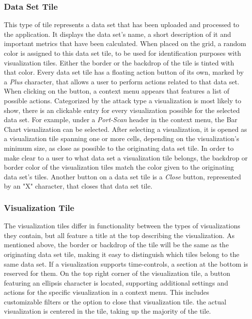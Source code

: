 \subsubsection{Data Set Tile}
This type of tile represents a data set that has been uploaded and processed to the application. It displays the data set's name, a short description of it and important metrics that have been calculated. When placed on the grid, a random color is assigned to this data set tile, to be used for identification purposes with visualization tiles. Either the border or the backdrop of the tile is tinted with that color. Every data set tile has a floating action button of its own, marked by a \emph{Plus} character, that allows a user to perform actions related to that data set. When clicking on the button, a context menu appears that features a list of possible actions. Categorized by the attack type a visualization is most likely to show, there is an clickable entry for every visualization possible for the selected data set. For example, under a \emph{Port-Scan} header in the context menu, the Bar Chart visualization can be selected. After selecting a visualization, it is opened as a visualization tile spanning one or more cells, depending on the visualization’s minimum size, as close as possible to the originating data set tile. In order to make clear to a user to what data set a visualization tile belongs, the backdrop or border color of the visualization tiles match the color given to the originating data set’s tiles. Another button on a data set tile is a \emph{Close} button, represented by an "X" character, that closes that data set tile.
\subsubsection{Visualization Tile}
The visualization tiles differ in functionality between the types of visualizations they contain, but all feature a title at the top describing the visualization. As mentioned above, the border or backdrop of the tile will be the same as the originating data set tile, making it easy to distinguish which tiles belong to the same data set. If a visualization supports time-controls, a section at the bottom is reserved for them. On the top right corner of the visualization tile, a button featuring an ellipsis character is located, supporting additional settings and actions for the specific visualization in a context menu. This includes customizable filters or the option to close that visualization tile. the actual visualization is centered in the tile, taking up the majority of the tile.

